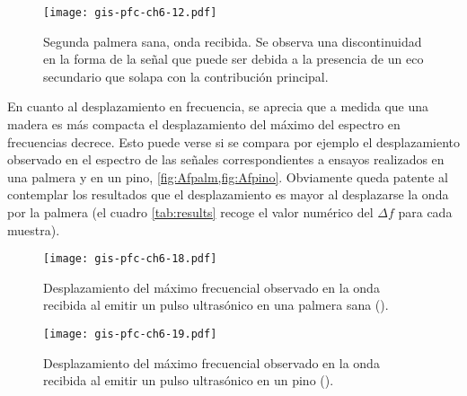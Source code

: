 \begin{figure}[p]
    \begin{center}
	\texttt{[image: gis-pfc-ch6-12.pdf]}
    \end{center}
    \caption[Segunda palmera sana (onda recibida)]{Segunda palmera sana,
    onda recibida. Se observa una discontinuidad en la forma de la señal
    que puede ser debida a la presencia de un eco secundario que solapa con
    la contribución principal.}
    \label{fig:palmera2-recibida}
\end{figure}

En cuanto al desplazamiento en frecuencia, se aprecia que a medida que una
madera es más compacta el desplazamiento del máximo del espectro en
frecuencias decrece. Esto puede verse si se compara por ejemplo el
desplazamiento observado en el espectro de las señales correspondientes a
ensayos realizados en una palmera y en un pino,
\cref{fig:Afpalm,fig:Afpino}. Obviamente queda patente al contemplar los
resultados que el desplazamiento es mayor al desplazarse la onda por la
palmera (el cuadro \cref{tab:results} recoge el valor numérico del $\Delta
f$ para cada muestra).

\begin{figure}[t]
    \begin{center}
	\texttt{[image: gis-pfc-ch6-18.pdf]}
    \end{center}
    \caption[Desplazamiento del máximo frecuencial
    (palmera)]{Desplazamiento del máximo frecuencial observado en la onda
    recibida al emitir un pulso ultrasónico en una palmera sana ().}
    \label{fig:Afpalm}
\end{figure}

\begin{figure}[bp]
    \begin{center}
	\texttt{[image: gis-pfc-ch6-19.pdf]}
    \end{center}
    \caption[Desplazamiento del máximo frecuencial (pino)]{Desplazamiento
    del máximo frecuencial observado en la onda recibida al emitir un pulso
    ultrasónico en un pino ().}
    \label{fig:Afpino}
\end{figure}

